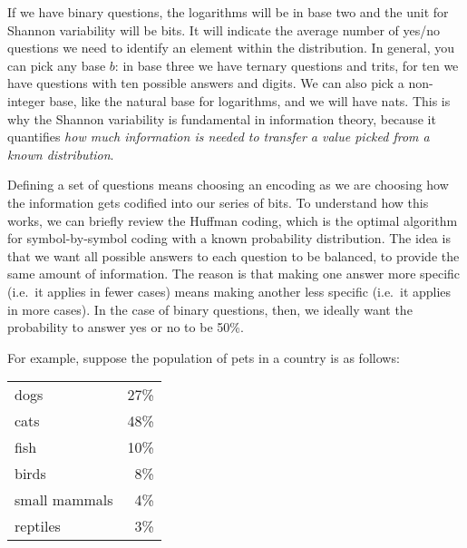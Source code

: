 \documentclass[iopart]{revtex4-1}
\begin{document}
If we have binary questions, the logarithms will be in base two and the unit for Shannon variability will be bits. It will indicate the average number of yes/no questions we need to identify an element within the distribution. In general, you can pick any base $b$: in base three we have ternary questions and trits, for ten we have questions with ten possible answers and digits. We can also pick a non-integer base, like the natural base for logarithms, and we will have nats. This is why the Shannon variability is fundamental in information theory, because it quantifies \emph{how much information is needed to transfer a value picked from a known distribution}.

Defining a set of questions means choosing an encoding as we are choosing how the information gets codified into our series of bits. To understand how this works, we can briefly review the Huffman coding,\cite{Huffman} which is the optimal algorithm for symbol-by-symbol coding with a known probability distribution. The idea is that we want all possible answers to each question to be balanced, to provide the same amount of information. The reason is that making one answer more specific (i.e.~it applies in fewer cases) means making another less specific (i.e.~it applies in more cases). In the case of binary questions, then, we ideally want the probability to answer yes or no to be 50\%.

For example, suppose the population of pets in a country is as follows:
\begin{table}[h]
\begin{tabular}{lr}
dogs & 27\% \\
cats & 48\% \\
fish & 10\% \\
birds & 8\% \\
small mammals & 4\% \\
reptiles & 3\%
\end{tabular}
\end{table}
\end{document}
